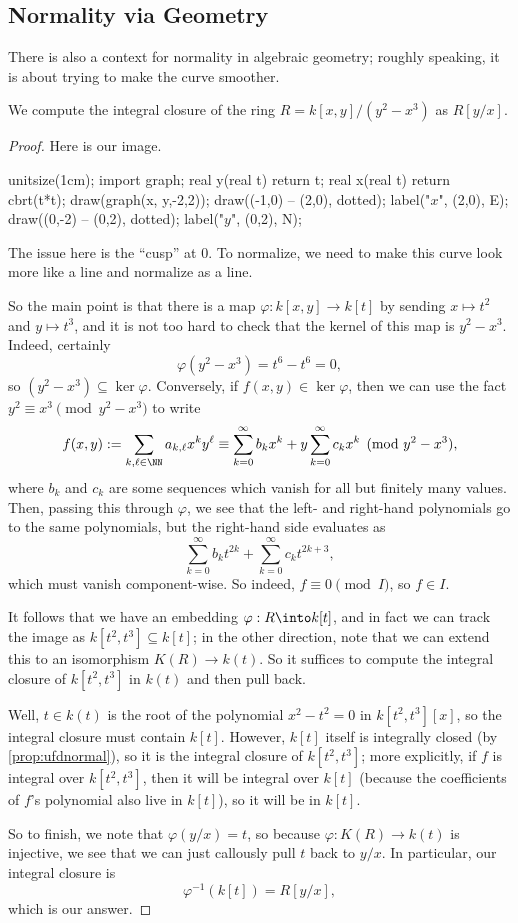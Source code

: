 \subsection{Normality via Geometry}
There is also a context for normality in algebraic geometry; roughly speaking, it is about trying to make the curve smoother.
\begin{exe}
	We compute the integral closure of the ring $R=k[x,y]/\left(y^2-x^3\right)$ as $R[y/x]$.
\end{exe}
\begin{proof}
	Here is our image.
	\begin{center}
		\begin{asy}
			unitsize(1cm);
			import graph;
			real y(real t)
			{
				return t;
			}
			real x(real t)
			{
				return cbrt(t*t);
			}
			draw(graph(x, y,-2,2));
			draw((-1,0) -- (2,0), dotted); label("$x$", (2,0), E);
			draw((0,-2) -- (0,2), dotted); label("$y$", (0,2), N);
		\end{asy}
	\end{center}
	The issue here is the ``cusp'' at $0$. To normalize, we need to make this curve look more like a line and normalize as a line.

	So the main point is that there is a map $\varphi:k[x,y]\to k[t]$ by sending $x\mapsto t^2$ and $y\mapsto t^3$, and it is not too hard to check that the kernel of this map is $y^2-x^3$. Indeed, certainly
	\[\varphi\left(y^2-x^3\right)=t^6-t^6=0,\]
	so $\left(y^2-x^3\right)\subseteq\ker\varphi$. Conversely, if $f(x,y)\in\ker\varphi$, then we can use the fact $y^2\equiv x^3\pmod{y^2-x^3}$ to write
	\[f(x,y):=\sum_{k,\ell\in\NN}a_{k,\ell}x^ky^\ell\equiv\sum_{k=0}^\infty b_kx^k+y\sum_{k=0}^\infty c_kx^k\pmod{y^2-x^3},\]
	where $b_k$ and $c_k$ are some sequences which vanish for all but finitely many values. Then, passing this through $\varphi$, we see that the left- and right-hand polynomials go to the same polynomials, but the right-hand side evaluates as
	\[\sum_{k=0}^\infty b_kt^{2k}+\sum_{k=0}^\infty c_kt^{2k+3},\]
	which must vanish component-wise. So indeed, $f\equiv0\pmod I$, so $f\in I$.

	It follows that we have an embedding $\varphi:R\into k[t]$, and in fact we can track the image as $k\left[t^2,t^3\right]\subseteq k[t]$; in the other direction, note that we can extend this to an isomorphism $K(R)\to k(t)$. So it suffices to compute the integral closure of $k\left[t^2,t^3\right]$ in $k(t)$ and then pull back.

	Well, $t\in k(t)$ is the root of the polynomial $x^2-t^2=0$ in $k\left[t^2,t^3\right][x]$, so the integral closure must contain $k[t]$. However, $k[t]$ itself is integrally closed (by \autoref{prop:ufdnormal}), so it is the integral closure of $k\left[t^2,t^3\right]$; more explicitly, if $f$ is integral over $k\left[t^2,t^3\right]$, then it will be integral over $k[t]$ (because the coefficients of $f$'s polynomial also live in $k[t]$), so it will be in $k[t]$.

	So to finish, we note that $\varphi(y/x)=t$, so because $\varphi:K(R)\to k(t)$ is injective, we see that we can just callously pull $t$ back to $y/x$. In particular, our integral closure is
	\[\varphi^{-1}(k[t])=\boxed{R[y/x]},\]
	which is our answer.
\end{proof}
